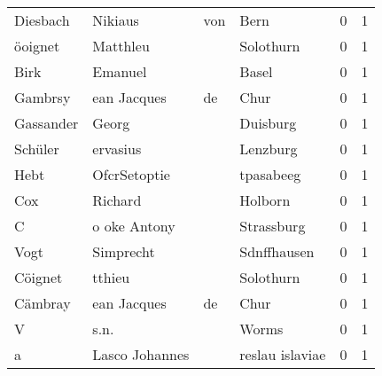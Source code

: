 \begin{center}
\begin{tiny}
\begin{longtabu}{llllrr}
                 Diesbach &                            Nikiaus &         von &                                        Bern &          0 &         1 \\
                  öoignet &                           Matthleu &             &                                   Solothurn &          0 &         1 \\
                     Birk &                            Emanuel &             &                                       Basel &          0 &         1 \\
                  Gambrsy &                        ean Jacques &          de &                                        Chur &          0 &         1 \\
                Gassander &                              Georg &             &                                    Duisburg &          0 &         1 \\
                  Schüler &                           ervasius &             &                                    Lenzburg &          0 &         1 \\
                     Hebt &                       OfcrSetoptie &             &                                   tpasabeeg &          0 &         1 \\
                      Cox &                            Richard &             &                                     Holborn &          0 &         1 \\
                        C &                       o oke Antony &             &                                  Strassburg &          0 &         1 \\
                     Vogt &                          Simprecht &             &                                 Sdnffhausen &          0 &         1 \\
                  Cöignet &                             tthieu &             &                                   Solothurn &          0 &         1 \\
                  Cämbray &                        ean Jacques &          de &                                        Chur &          0 &         1 \\
                        V &                               s.n. &             &                                       Worms &          0 &         1 \\
                        a &                     Lasco Johannes &             &                             reslau islaviae &          0 &         1 \\

\end{longtabu}
\end{tiny}
\end{center}
